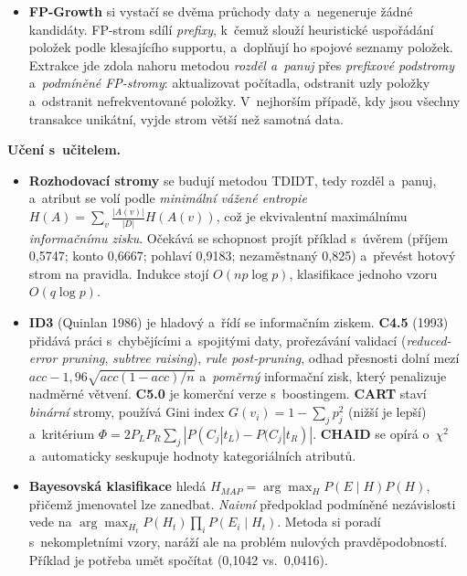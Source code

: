\documentclass[11pt,a4paper]{article}
\theoremstyle{definition}
\begin{document}
\begin{itemize}
      to, že $\langle\{3\}\{8\}\rangle$ a~$\langle\{3,8\}\rangle$ se navzájem
      \emph{neobsahují}.
\item \textbf{FP-Growth} si vystačí se dvěma průchody daty a~negeneruje žádné kandidáty.
      FP-strom sdílí \emph{prefixy}, k~čemuž slouží heuristické uspořádání položek podle
      klesajícího supportu, a~doplňují ho spojové seznamy položek. Extrakce jde zdola nahoru
      metodou \emph{rozděl a~panuj} přes \emph{prefixové podstromy} a~\emph{podmíněné
      FP-stromy}: aktualizovat počítadla, odstranit uzly položky a~odstranit nefrekventované
      položky. V~nejhorším případě, kdy jsou všechny transakce unikátní, vyjde strom větší než
      samotná data.
\end{itemize}

\textbf{Učení s~učitelem.}
\begin{itemize}
\item \textbf{Rozhodovací stromy} se budují metodou TDIDT, tedy rozděl a~panuj, a~atribut se
      volí podle \emph{minimální vážené entropie}
      $H(A)=\sum_v\frac{|A(v)|}{|D|}H(A(v))$, což je ekvivalentní maximálnímu
      \emph{informačnímu zisku}. Očekává se schopnost projít příklad s~úvěrem (příjem 0,5747;
      konto 0,6667; pohlaví 0,9183; nezaměstnaný 0,825) a~převést hotový strom na pravidla.
      Indukce stojí $O(np\log p)$, klasifikace jednoho vzoru $O(q\log p)$.
\item \textbf{ID3} (Quinlan 1986) je hladový a~řídí se informačním ziskem. \textbf{C4.5}
      (1993) přidává práci s~chybějícími a~spojitými daty, prořezávání validací
      (\emph{reduced-error pruning}, \emph{subtree raising}), \emph{rule post-pruning}, odhad
      přesnosti dolní mezí $\mathit{acc}-1{,}96\sqrt{\mathit{acc}(1-\mathit{acc})/n}$
      a~\emph{poměrný} informační zisk, který penalizuje nadměrné větvení. \textbf{C5.0} je
      komerční verze s~boostingem. \textbf{CART} staví \emph{binární} stromy, používá Gini
      index $G(v_i)=1-\sum_j p_j^2$ (nižší je lepší) a~kritérium
      $\Phi=2P_LP_R\sum_j|P(C_j|t_L)-P(C_j|t_R)|$. \textbf{CHAID} se opírá o~$\chi^2$
      a~automaticky seskupuje hodnoty kategoriálních atributů.
\item \textbf{Bayesovská klasifikace} hledá $H_{MAP}=\arg\max_H P(E\mid H)P(H)$, přičemž
      jmenovatel lze zanedbat. \emph{Naivní} předpoklad podmíněné nezávislosti vede na
      $\arg\max_{H_t}P(H_t)\prod_i P(E_i\mid H_t)$. Metoda si poradí s~nekompletními vzory,
      naráží ale na problém nulových pravděpodobností. Příklad je potřeba umět spočítat
      (0,1042 vs.\ 0,0416).

\end{itemize}
\end{document}
